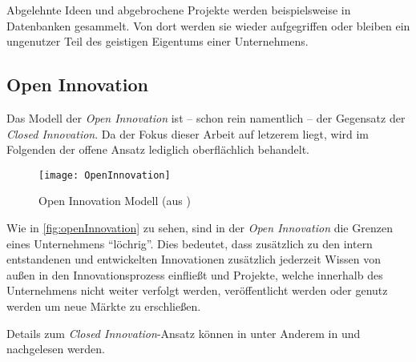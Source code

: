 Abgelehnte Ideen und abgebrochene Projekte werden beispielsweise in Datenbanken gesammelt.
Von dort werden sie wieder aufgegriffen oder bleiben ein ungenutzer Teil des geistigen Eigentums einer Unternehmens.


\subsection{Open Innovation}\label{sec:grundlagen-open}

Das Modell der \textit{Open Innovation} ist -- schon rein namentlich -- der Gegensatz der \textit{Closed Innovation}.
Da der Fokus dieser Arbeit auf letzerem liegt,
wird im Folgenden der offene Ansatz lediglich oberflächlich behandelt.

\begin{figure}[ht!]
    \centering
    \texttt{[image: OpenInnovation]}
    \caption{Open Innovation Modell (aus \cite[23]{herzog2011})}
    \label{fig:openInnovation}
\end{figure}

Wie in \autoref{fig:openInnovation} zu sehen,
sind in der \textit{Open Innovation} die Grenzen eines Unternehmens \enquote{löchrig}.
Dies bedeutet, dass zusätzlich zu den intern entstandenen und entwickelten Innovationen
zusätzlich jederzeit Wissen von außen in den Innovationsprozess einfließt
und Projekte, welche innerhalb des Unternehmens nicht weiter verfolgt werden,
veröffentlicht werden oder genutz werden um neue Märkte zu erschließen.

Details zum \textit{Closed Innovation}-Ansatz können in unter Anderem
in \cite[60\psqq]{chesbrough2003} und \cite[21\psqq]{herzog2011} nachgelesen werden.